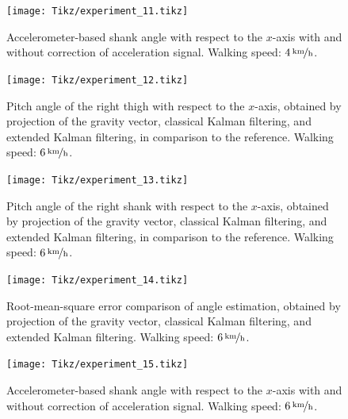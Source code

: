 \begin{figure}
	\centering
	\setlength\figureheight{7cm} 
	\setlength\figurewidth{\textwidth}
	\texttt{[image: Tikz/experiment\_11.tikz]}
	\caption{Accelerometer-based shank angle with respect to the $x$-axis with and without correction of acceleration signal. Walking speed: $\unitfrac[4]{km}{h}$.}
	\label{fig:experiment_11}
\end{figure}

\begin{figure}
	\centering
	\setlength\figureheight{6.8cm} 
	\setlength\figurewidth{\textwidth}
	\texttt{[image: Tikz/experiment\_12.tikz]}
	\caption{Pitch angle of the right thigh with respect to the $x$-axis, obtained by projection of the gravity vector, classical Kalman filtering, and extended Kalman filtering, in comparison to the reference. Walking speed: $\unitfrac[6]{km}{h}$.}
	\label{fig:experiment_12}
\end{figure}

\begin{figure}
	\centering
	\setlength\figureheight{6.8cm} 
	\setlength\figurewidth{\textwidth}
	\texttt{[image: Tikz/experiment\_13.tikz]}
	\caption{Pitch angle of the right shank with respect to the $x$-axis, obtained by projection of the gravity vector, classical Kalman filtering, and extended Kalman filtering, in comparison to the reference. Walking speed: $\unitfrac[6]{km}{h}$.}
	\label{fig:experiment_13}
\end{figure}

\begin{figure}
	\centering
	\setlength\figureheight{7cm} 
	\setlength\figurewidth{\textwidth}
	\texttt{[image: Tikz/experiment\_14.tikz]}
	\caption{Root-mean-square error comparison of angle estimation, obtained by projection of the gravity vector, classical Kalman filtering, and extended Kalman filtering. Walking speed: $\unitfrac[6]{km}{h}$.}
	\label{fig:experiment_14}
\end{figure}

\begin{figure}
	\centering
	\setlength\figureheight{7cm} 
	\setlength\figurewidth{\textwidth}
	\texttt{[image: Tikz/experiment\_15.tikz]}
	\caption{Accelerometer-based shank angle with respect to the $x$-axis with and without correction of acceleration signal. Walking speed: $\unitfrac[6]{km}{h}$.}
	\label{fig:experiment_15}
\end{figure}

